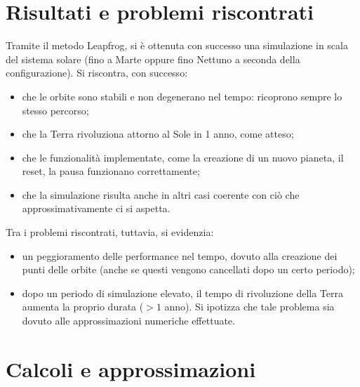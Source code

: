 \documentclass{article}
\begin{document}
\section{Risultati e problemi riscontrati}
Tramite il metodo Leapfrog, si è ottenuta con successo una simulazione in scala del sistema solare (fino a Marte oppure fino Nettuno a seconda della configurazione). 
Si riscontra, con successo:
\begin{itemize}
    \item che le orbite sono stabili e non degenerano nel tempo: ricoprono sempre lo stesso percorso;
    \item che la Terra rivoluziona attorno al Sole in 1 anno, come atteso;
    \item che le funzionalità implementate, come la creazione di un nuovo pianeta, il reset, la pausa funzionano correttamente;
    \item che la simulazione risulta anche in altri casi coerente con ciò che approssimativamente ci si aspetta.
\end{itemize}

Tra i problemi riscontrati, tuttavia, si evidenzia:
\begin{itemize}
    \item un peggioramento delle performance nel tempo, dovuto alla creazione dei punti delle orbite (anche se questi vengono cancellati dopo un certo periodo);
    \item dopo un periodo di simulazione elevato, il tempo di rivoluzione della Terra aumenta la proprio durata ($> 1$ anno). Si ipotizza che tale problema sia dovuto alle approssimazioni numeriche effettuate.
\end{itemize}

\subsection{}
\appendix
\section{Calcoli e approssimazioni}
\end{document}
